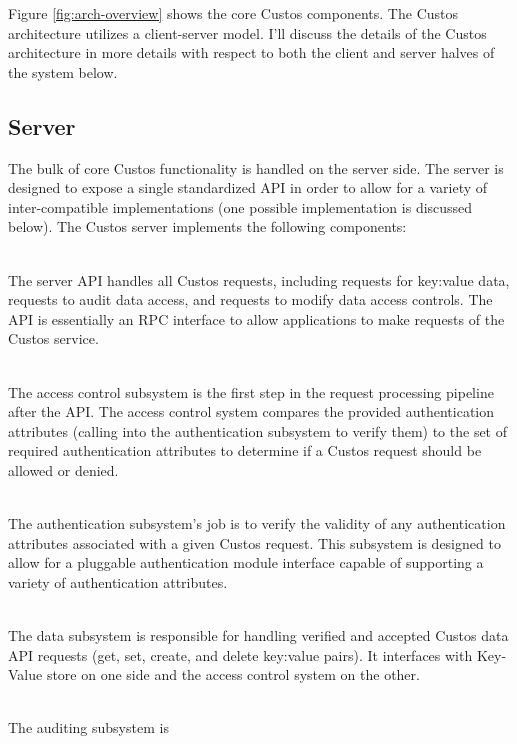 Figure \ref{fig:arch-overview} shows the core Custos components. The
Custos architecture utilizes a client-server model. I'll discuss the
details of the Custos architecture in more details with respect to
both the client and server halves of the system below.

\subsection{Server}

The bulk of core Custos functionality is handled on the server
side. The server is designed to expose a single standardized API in
order to allow for a variety of inter-compatible implementations (one
possible implementation is discussed below). The Custos server
implements the following components:

\begin{packed_desc}
\item[API] \hfill \\ The server API handles all Custos requests,
  including requests for key:value data, requests to audit data
  access, and requests to modify data access controls. The API is
  essentially an RPC interface to allow applications to make requests
  of the Custos service.
\item[Access Control Subsystem] \hfill \\ The access control subsystem
  is the first step in the request processing pipeline after the
  API. The access control system compares the provided authentication
  attributes (calling into the authentication subsystem to verify
  them) to the set of required authentication attributes to determine
  if a Custos request should be allowed or denied.
\item[Authentication Subsystem] \hfill \\ The authentication
  subsystem's job is to verify the validity of any authentication
  attributes associated with a given Custos request. This subsystem is
  designed to allow for a pluggable authentication module interface
  capable of supporting a variety of authentication attributes.
\item[Data Subsystem] \hfill \\ The data subsystem is responsible for
  handling verified and accepted Custos data API requests (get, set,
  create, and delete key:value pairs). It interfaces with Key-Value
  store on one side and the access control system on the other.
\item[Auditing Subsystem] \hfill \\ The auditing subsystem is

\end{packed_desc}
